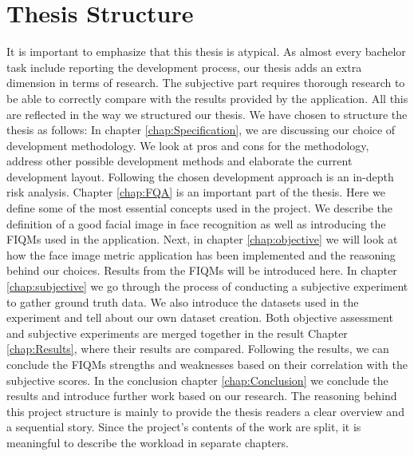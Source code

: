 \section{Thesis Structure}
It is important to emphasize that this thesis is atypical. As almost every bachelor task include reporting the development process, our thesis adds an extra dimension in terms of research. The subjective part requires thorough research to be able to correctly compare with the results provided by the application. All this are reflected in the way we structured our thesis. 
We have chosen to structure the thesis as follows: In chapter \ref{chap:Specification}, we are discussing our choice of development methodology. We look at pros and cons for the methodology, address other possible development methods and elaborate the current development layout. Following the chosen development approach is an in-depth risk analysis. Chapter \ref{chap:FQA} is an important part of the thesis. Here we define some of the most essential concepts used in the project. We describe the definition of a good facial image in face recognition as well as introducing the FIQMs used in the application. Next, in chapter \ref{chap:objective} we will look at how the face image metric application has been implemented and the reasoning behind our choices. Results from the FIQMs will be introduced here. In chapter \ref{chap:subjective} we go through the process of conducting a subjective experiment to gather ground truth data. We also introduce the datasets used in the experiment and tell about our own dataset creation. 
Both objective assessment and subjective experiments are merged together in the result Chapter \ref{chap:Results}, where their results are compared. Following the results, we can conclude the FIQMs strengths and weaknesses based on their correlation with the subjective scores. In the conclusion chapter \ref{chap:Conclusion} we conclude the results and introduce further work based on our research. The reasoning behind this project structure is mainly to provide the thesis readers a clear overview and a sequential story. Since the project's contents of the work are split, it is meaningful to describe the workload in separate chapters. 